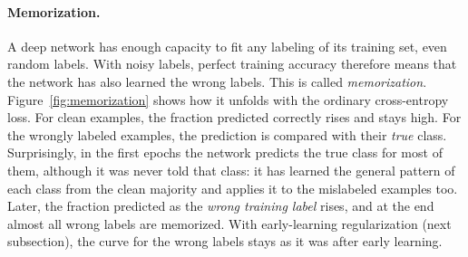 \paragraph{Memorization.}
A deep network has enough capacity to fit any labeling of its training set,
even random labels. With noisy labels, perfect training accuracy therefore
means that the network has also learned the wrong labels. This is called
\emph{memorization}. Figure~\ref{fig:memorization} shows how it unfolds with
the ordinary cross-entropy loss. For clean examples, the fraction predicted
correctly rises and stays high. For the wrongly labeled examples, the
prediction is compared with their \emph{true} class. Surprisingly, in the
first epochs the network predicts the true class for most of them, although
it was never told that class: it has learned the general pattern of each
class from the clean majority and applies it to the mislabeled examples too.
Later, the fraction predicted as the \emph{wrong training label} rises, and
at the end almost all wrong labels are memorized. With early-learning
regularization (next subsection), the curve for the wrong labels stays as
it was after early learning.

